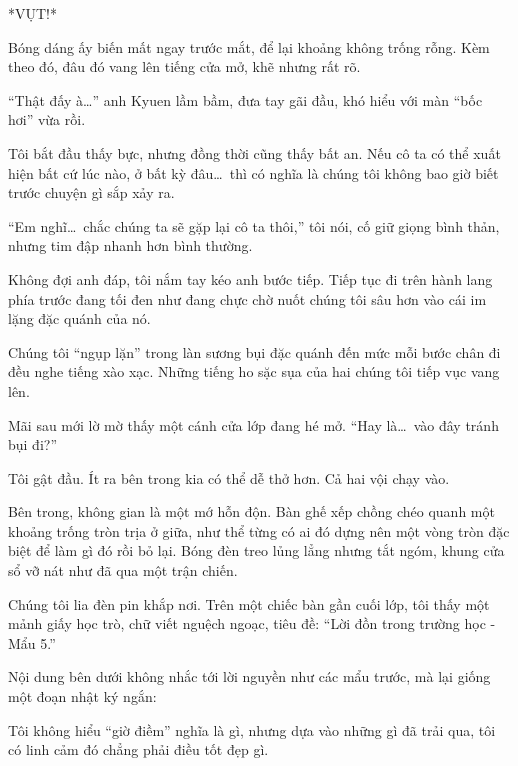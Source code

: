 \documentclass[../main.tex]{subfiles}
\begin{document}
*VỤT!*

Bóng dáng ấy biến mất ngay trước mắt, để lại khoảng không trống rỗng. Kèm theo đó, đâu đó vang lên tiếng cửa mở, khẽ nhưng rất rõ.

``Thật đấy à\dots'' anh Kyuen lầm bầm, đưa tay gãi đầu, khó hiểu với màn ``bốc hơi'' vừa rồi.

Tôi bắt đầu thấy bực, nhưng đồng thời cũng thấy bất an. Nếu cô ta có thể xuất hiện bất cứ lúc nào, ở bất kỳ đâu\dots\ thì có nghĩa là chúng tôi không bao giờ biết trước chuyện gì sắp xảy ra.

``Em nghĩ\dots\ chắc chúng ta sẽ gặp lại cô ta thôi,'' tôi nói, cố giữ giọng bình thản, nhưng tim đập nhanh hơn bình thường.

Không đợi anh đáp, tôi nắm tay kéo anh bước tiếp. Tiếp tục đi trên hành lang phía trước đang tối đen như đang chực chờ nuốt chúng tôi sâu hơn vào cái im lặng đặc quánh của nó.

\ct

Chúng tôi ``ngụp lặn'' trong làn sương bụi đặc quánh đến mức mỗi bước chân đi đều nghe tiếng xào xạc. Những tiếng ho sặc sụa của hai chúng tôi tiếp vục vang lên.

Mãi sau mới lờ mờ thấy một cánh cửa lớp đang hé mở. ``Hay là\dots\ vào đây tránh bụi đi?''

Tôi gật đầu. Ít ra bên trong kia có thể dễ thở hơn. Cả hai vội chạy vào.

Bên trong, không gian là một mớ hỗn độn. Bàn ghế xếp chồng chéo quanh một khoảng trống tròn trịa ở giữa, như thể từng có ai đó dựng nên một vòng tròn đặc biệt để làm gì đó rồi bỏ lại. Bóng đèn treo lủng lẳng nhưng tắt ngóm, khung cửa sổ vỡ nát như đã qua một trận chiến.


Chúng tôi lia đèn pin khắp nơi. Trên một chiếc bàn gần cuối lớp, tôi thấy một mảnh giấy học trò, chữ viết nguệch ngoạc, tiêu đề: ``{\vnmsans Lời đồn trong trường học - Mẩu 5.}''

Nội dung bên dưới không nhắc tới lời nguyền như các mẩu trước, mà lại giống một đoạn nhật ký ngắn:


Tôi không hiểu ``giờ điềm'' nghĩa là gì, nhưng dựa vào những gì đã trải qua, tôi có linh cảm đó chẳng phải điều tốt đẹp gì.
\end{document}
